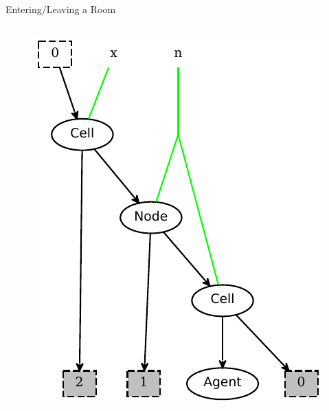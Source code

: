 \documentclass{beamer}
\begin{document}
\begin{frame}{Entering/Leaving a Room}
\begin{columns}
\begin{column}{0.45\textwidth}
\begin{figure}
        \includegraphics[width=\textwidth]{../models/agent2/goIn_rhs.pdf}
      \end{figure}
    \end{column}
  \end{columns}
\end{frame}
\end{document}
